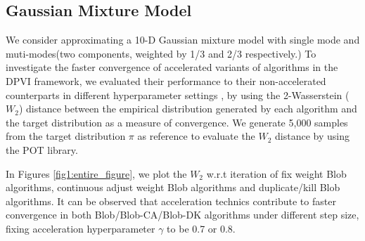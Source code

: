 \subsection{Gaussian Mixture Model}
We consider approximating a 10-D Gaussian mixture model with single mode and muti-modes(two components, weighted by 1/3 and 2/3 respectively.)
To investigate the faster convergence of accelerated variants of algorithms in the DPVI framework, 
we evaluated their performance to their non-accelerated counterparts in different hyperparameter settings
, by using the 2-Wasserstein ($W_2$) distance between the empirical distribution 
generated by each algorithm and the target distribution as a measure of convergence.
We generate 5,000 samples from the target distribution $\pi$ as reference to evaluate the $W_2$ distance by using the POT library.

In Figures \ref{fig1:entire_figure}, we plot the $W_2$ w.r.t iteration of fix weight Blob algorithms,
 continuous adjust weight Blob algorithms and duplicate/kill Blob algorithms. 
It can be observed that acceleration technics contribute to faster convergence in both Blob/Blob-CA/Blob-DK algorithms 
under different step size, fixing acceleration hyperparameter $\gamma$ to be 0.7 or 0.8.

